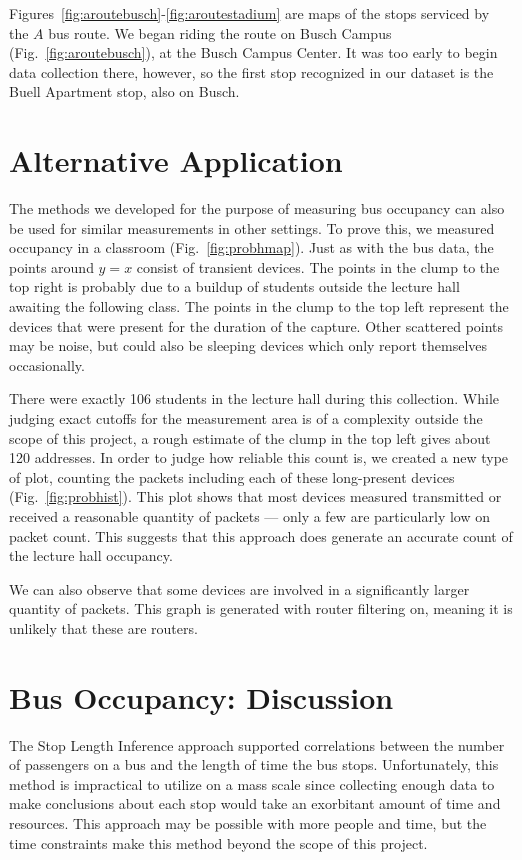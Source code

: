 \documentclass[12pt,journal,compsoc]{IEEEtran} %
\begin{document}
Figures~\ref{fig:aroutebusch}-\ref{fig:aroutestadium} are maps of the stops serviced by the $A$ bus route.
We began riding the route on Busch Campus (Fig.~\ref{fig:aroutebusch}), at the Busch Campus Center.
It was too early to begin data collection there, however, so the first stop recognized in our dataset is the Buell Apartment stop, also on Busch.




\section{Alternative Application}
The methods we developed for the purpose of measuring bus occupancy can also be used for similar measurements in other settings.
To prove this, we measured occupancy in a classroom (Fig.~\ref{fig:probhmap}).
Just as with the bus data, the points around \(y=x\) consist of transient devices.
The points in the clump to the top right is probably due to a buildup of students outside the lecture hall awaiting the following class.
The points in the clump to the top left represent the devices that were present for the duration of the capture.
Other scattered points may be noise, but could also be sleeping devices which only report themselves occasionally.

There were exactly 106 students in the lecture hall during this collection.
While judging exact cutoffs for the measurement area is of a complexity outside the scope of this project, a rough estimate of the clump in the top left gives about 120 addresses.
In order to judge how reliable this count is, we created a new type of plot, counting the packets including each of these long-present devices (Fig.~\ref{fig:probhist}).
This plot shows that most devices measured transmitted or received a reasonable quantity of packets --- only a few are particularly low on packet count.
This suggests that this approach does generate an accurate count of the lecture hall occupancy.

We can also observe that some devices are involved in a significantly larger quantity of packets.
This graph is generated with router filtering on, meaning it is unlikely that these are routers.

\section{Bus Occupancy: Discussion}

The Stop Length Inference approach supported correlations between the number of passengers on a bus and the length of time the bus stops.
Unfortunately, this method is impractical to utilize on a mass scale since collecting enough data to make conclusions about each stop would take an exorbitant amount of time and resources.
This approach may be possible with more people and time, but the time constraints make this method beyond the scope of this project.
\end{document}
